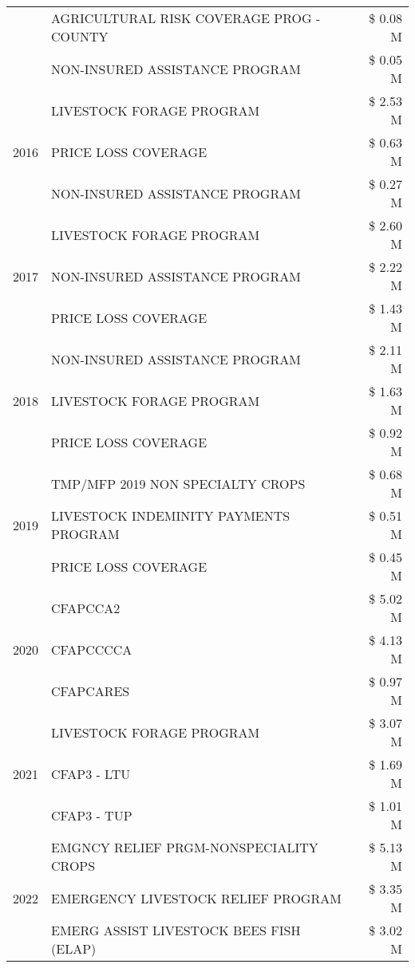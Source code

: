 \begin{tabular}{llr}
 & AGRICULTURAL RISK COVERAGE PROG - COUNTY & \$ 0.08 M \\
 & NON-INSURED ASSISTANCE PROGRAM & \$ 0.05 M \\
\cline{1-3}
\multirow[t]{3}{*}{2016} & LIVESTOCK FORAGE PROGRAM & \$ 2.53 M \\
 & PRICE LOSS COVERAGE & \$ 0.63 M \\
 & NON-INSURED ASSISTANCE PROGRAM & \$ 0.27 M \\
\cline{1-3}
\multirow[t]{3}{*}{2017} & LIVESTOCK FORAGE PROGRAM & \$ 2.60 M \\
 & NON-INSURED ASSISTANCE PROGRAM & \$ 2.22 M \\
 & PRICE LOSS COVERAGE & \$ 1.43 M \\
\cline{1-3}
\multirow[t]{3}{*}{2018} & NON-INSURED ASSISTANCE PROGRAM & \$ 2.11 M \\
 & LIVESTOCK FORAGE PROGRAM & \$ 1.63 M \\
 & PRICE LOSS COVERAGE & \$ 0.92 M \\
\cline{1-3}
\multirow[t]{3}{*}{2019} & TMP/MFP 2019 NON SPECIALTY CROPS & \$ 0.68 M \\
 & LIVESTOCK INDEMINITY PAYMENTS PROGRAM & \$ 0.51 M \\
 & PRICE LOSS COVERAGE & \$ 0.45 M \\
\cline{1-3}
\multirow[t]{3}{*}{2020} & CFAPCCA2 & \$ 5.02 M \\
 & CFAPCCCCA & \$ 4.13 M \\
 & CFAPCARES & \$ 0.97 M \\
\cline{1-3}
\multirow[t]{3}{*}{2021} & LIVESTOCK FORAGE PROGRAM & \$ 3.07 M \\
 & CFAP3 - LTU & \$ 1.69 M \\
 & CFAP3 - TUP & \$ 1.01 M \\
\cline{1-3}
\multirow[t]{3}{*}{2022} & EMGNCY RELIEF PRGM-NONSPECIALITY CROPS & \$ 5.13 M \\
 & EMERGENCY LIVESTOCK RELIEF PROGRAM & \$ 3.35 M \\
 & EMERG ASSIST LIVESTOCK BEES FISH (ELAP) & \$ 3.02 M \\
\cline{1-3}
\bottomrule
\end{tabular}
